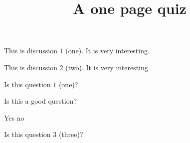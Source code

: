 \documentclass[onepage]{webquiz}
\title{A one page quiz}
\begin{document}
  \begin{discussion}
        This is discussion $1$ (one). It is very interesting.
  \end{discussion}
  \begin{discussion}
     This is discussion $2$ (two). It is very interesting.
  \end{discussion}
  \begin{question} Is this question $1$ (one)? \end{question}
  \begin{question} Is this a good question?
    \begin{choice}\correct Yes \incorrect no\end{choice}
  \end{question}
  \begin{question} Is this question $3$ (three)? \end{question}
\end{document}
